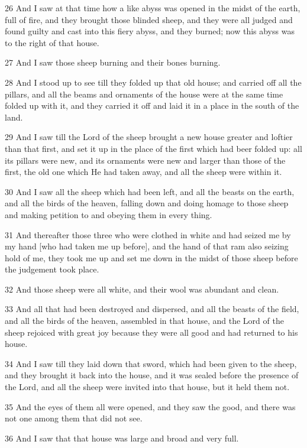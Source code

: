 \par 26 And I saw at that time how a like abyss was opened in the midst of the earth, full of fire, and they brought those blinded sheep, and they were all judged and found guilty and cast into this fiery abyss, and they burned; now this abyss was to the right of that house.
\par 27 And I saw those sheep burning and their bones burning.
\par 28 And I stood up to see till they folded up that old house; and carried off all the pillars, and all the beams and ornaments of the house were at the same time folded up with it, and they carried it off and laid it in a place in the south of the land.
\par 29 And I saw till the Lord of the sheep brought a new house greater and loftier than that first, and set it up in the place of the first which had beer folded up: all its pillars were new, and its ornaments were new and larger than those of the first, the old one which He had taken away, and all the sheep were within it.
\par 30 And I saw all the sheep which had been left, and all the beasts on the earth, and all the birds of the heaven, falling down and doing homage to those sheep and making petition to and obeying them in every thing.
\par 31 And thereafter those three who were clothed in white and had seized me by my hand [who had taken me up before], and the hand of that ram also seizing hold of me, they took me up and set me down in the midst of those sheep before the judgement took place.
\par 32 And those sheep were all white, and their wool was abundant and clean.
\par 33 And all that had been destroyed and dispersed, and all the beasts of the field, and all the birds of the heaven, assembled in that house, and the Lord of the sheep rejoiced with great joy because they were all good and had returned to his house.
\par 34 And I saw till they laid down that sword, which had been given to the sheep, and they brought it back into the house, and it was sealed before the presence of the Lord, and all the sheep were invited into that house, but it held them not.
\par 35 And the eyes of them all were opened, and they saw the good, and there was not one among them that did not see.
\par 36 And I saw that that house was large and broad and very full.
